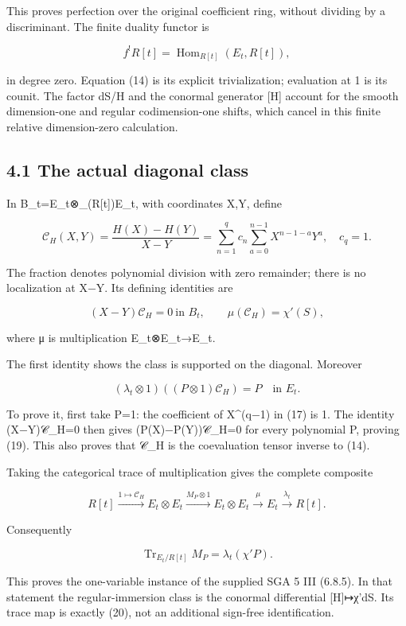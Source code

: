 \documentclass[
  11pt,
]{article}
\begin{document}
This proves perfection over the original coefficient ring, without
dividing by a discriminant. The finite duality functor is

\[
f^!R[t]=\operatorname{Hom}_{R[t]}(E_t,R[t]),
\tag{16}
\]

in degree zero. Equation (14) is its explicit trivialization; evaluation
at 1 is its counit. The factor dS/H and the conormal generator {[}H{]}
account for the smooth dimension-one and regular codimension-one shifts,
which cancel in this finite relative dimension-zero calculation.

\subsection{4.1 The actual diagonal
class}\label{the-actual-diagonal-class}

In B\_t=E\_t⊗\_(R{[}t{]})E\_t, with coordinates X,Y, define

\[
\mathcal C_H(X,Y)=\frac{H(X)-H(Y)}{X-Y}
 =\sum_{n=1}^{q}c_n\sum_{a=0}^{n-1}X^{n-1-a}Y^a,
\quad c_q=1.
\tag{17}
\]

The fraction denotes polynomial division with zero remainder; there is
no localization at X−Y. Its defining identities are

\[
(X-Y)\mathcal C_H=0\ \text{in }B_t,
\qquad \mu(\mathcal C_H)=\chi'(S),
\tag{18}
\]

where μ is multiplication E\_t⊗E\_t→E\_t.

The first identity shows the class is supported on the diagonal.
Moreover

\[
(\lambda_t\otimes1)((P\otimes1)\mathcal C_H)=P
\quad\text{in }E_t.
\tag{19}
\]

To prove it, first take P=1: the coefficient of X\^{}(q−1) in (17) is 1.
The identity (X−Y)𝒞\_H=0 then gives (P(X)−P(Y))𝒞\_H=0 for every
polynomial P, proving (19). This also proves that 𝒞\_H is the
coevaluation tensor inverse to (14).

Taking the categorical trace of multiplication gives the complete
composite

\[
R[t]\xrightarrow{1\mapsto\mathcal C_H}E_t\otimes E_t
\xrightarrow{M_P\otimes1}E_t\otimes E_t
\xrightarrow{\mu}E_t\xrightarrow{\lambda_t}R[t].
\tag{20}
\]

Consequently

\[
\boxed{\operatorname{Tr}_{E_t/R[t]}M_P
 =\lambda_t(\chi'P).}
\tag{21}
\]

This proves the one-variable instance of the supplied SGA 5 III (6.8.5).
In that statement the regular-immersion class is the conormal
differential {[}H{]}↦χ'dS. Its trace map is exactly (20), not an
additional sign-free identification.
\end{document}
